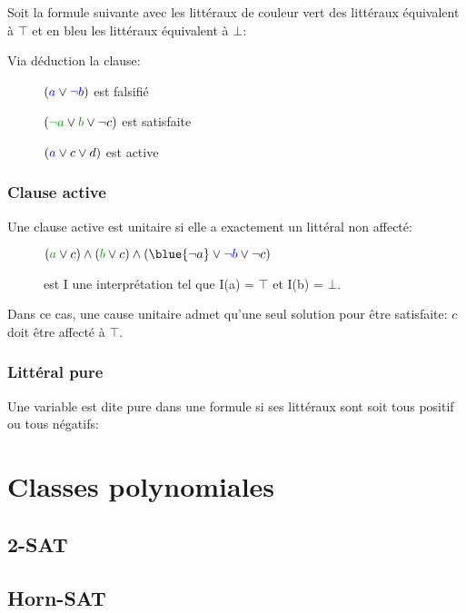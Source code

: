 Soit la formule suivante avec les littéraux de couleur vert des littéraux équivalent à $\top$ et en bleu les littéraux équivalent à $\bot$:\\

Via déduction la clause:
\begin{description}
\item[] $(\textcolor{blue}{a} \vee \textcolor{blue}{\neg b})$ est falsifié
\item[] $(\cvert{\neg a} \vee \cvert{b} \vee \neg c)$ est satisfaite
\item[] $(\textcolor{blue}{a} \vee c \vee d)$ est active
\end{description}

\pagebreak
\subsection{Clause active}
Une clause active est unitaire si elle a exactement un littéral non affecté:
\begin{description}
\item[] $(\cvert{a} \vee c) \wedge (\cvert{b} \vee c) \wedge (\blue{\neg a} \vee \cblue{\neg b} \vee \neg c)$
\item[] est I une interprétation tel que I(a) = $\top$ et I(b) = $\bot$.
\end{description}
Dans ce cas, une cause unitaire admet qu'une seul solution pour être satisfaite:
$c$ doit être affecté à $\top$.\\

\subsection{Littéral pure}
Une variable est dite pure dans une formule si ses littéraux sont soit tous positif ou tous négatifs:\\
\pagebreak

\chapter{Classes polynomiales}
\pagebreak
\section{2-SAT}
\section{Horn-SAT}
